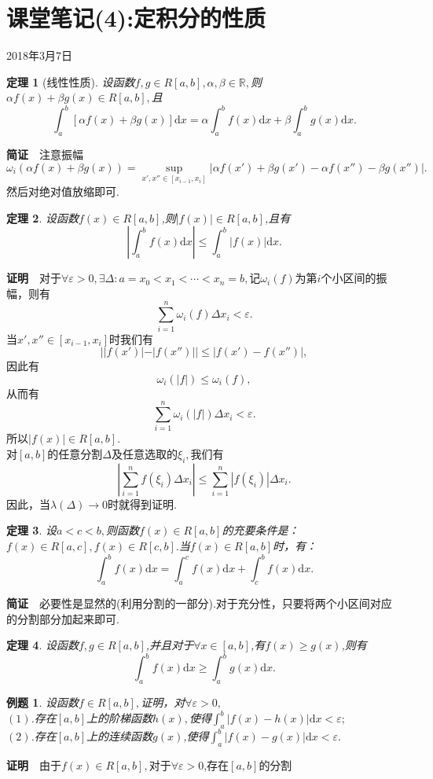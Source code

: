 \documentclass[UTF8]{article}
\newcommand{\R}{\mathbb{R}}
\newcommand{\dx}{\mathrm{d}x}
\newcommand{\zm}{\textbf{证明}$\quad$}
\newcommand{\jz}{\textbf{简证}$\quad$}
\newtheorem{thm}{\hspace{2em}定理}[section]
\newtheorem{exa}{\hspace{2em}例题}[section]
\begin{document}
\section{课堂笔记(4):定积分的性质}
\begin{center}
  2018年3月7日
\end{center}
\begin{thm}[线性性质]
  设函数$f,g\in R[a,b],\alpha,\beta\in\R,$则$\alpha f(x)+\beta g(x)\in R[a,b],$且
  $$\int_a^b[\alpha f(x)+\beta g(x)]\dx=\alpha\int_a^bf(x)\dx+\beta\int_a^bg(x)\dx.$$
\end{thm}
\jz 注意振幅$\omega_i(\alpha f(x)+\beta g(x))=\sup\limits_{x',x''\in[x_{i-1},x_i]}|\alpha f(x')+\beta g(x')-\alpha f(x'')-\beta g(x'')|.$
然后对绝对值放缩即可.
\begin{thm}
  设函数$f(x)\in R[a,b]$,则$|f(x)|\in R[a,b]$,且有
  $$\left|\int_a^bf(x)\dx\right|\le\int_a^b|f(x)|\dx.$$
\end{thm}
\zm 对于$\forall\varepsilon>0,\exists\Delta:a=x_0<x_1<\cdots<x_n=b,$记$\omega_i(f)$为第$i$个小区间的振幅，则有
$$\sum_{i=1}^n\omega_i(f)\Delta x_i<\varepsilon.$$
当$x',x''\in[x_{i-1},x_i]$时我们有
$$||f(x')|-|f(x'')||\le|f(x')-f(x'')|,$$因此有
$$\omega_i(|f|)\le\omega_i(f),$$
从而有
$$\sum_{i=1}^n\omega_i(|f|)\Delta x_i<\varepsilon.$$所以$|f(x)|\in R[a,b].$\\
对$[a,b]$的任意分割$\Delta$及任意选取的$\xi_i,$我们有
$$\left|\sum_{i=1}^nf(\xi_i)\Delta x_i\right|\le\sum_{i=1}^n|f(\xi_i)|\Delta x_i.$$
因此，当$\lambda(\Delta)\to 0$时就得到证明.
\begin{thm}
  设$a<c<b,$则函数$f(x)\in R[a,b]$的充要条件是：$f(x)\in R[a,c],f(x)\in R[c,b].$当$f(x)\in R[a,b]$时，有：
  $$\int_a^bf(x)\dx=\int_a^cf(x)\dx+\int_c^bf(x)\dx.$$
\end{thm}
\jz 必要性是显然的(利用分割的一部分).对于充分性，只要将两个小区间对应的分割部分加起来即可.
\begin{thm}
  设函数$f,g\in R[a,b]$,并且对于$\forall x\in[a,b]$,有$f(x)\ge g(x)$,则有
  $$\int_a^bf(x)\dx\ge\int_a^bg(x)\dx.$$
\end{thm}
\begin{exa}
  设函数$f\in R[a,b],$证明，对$\forall\varepsilon>0,$\\
    $(1)$.存在$[a,b]$上的阶梯函数$h(x),$使得$\displaystyle\int_a^b|f(x)-h(x)|\dx<\varepsilon;$\\
    $(2)$.存在$[a,b]$上的连续函数$g(x)$,使得$\displaystyle\int_a^b|f(x)-g(x)|\dx<\varepsilon.$
\end{exa}
\zm 由于$f(x)\in R[a,b],$对于$\forall\varepsilon>0$,存在$[a,b]$的分割
\end{document}

